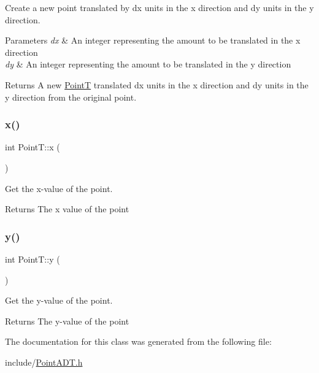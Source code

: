 Create a new point translated by dx units in the x direction and dy units in the y direction. 


\begin{DoxyParams}{Parameters}
{\em dx} & An integer representing the amount to be translated in the x direction \\
\hline
{\em dy} & An integer representing the amount to be translated in the y direction \\
\hline
\end{DoxyParams}
\begin{DoxyReturn}{Returns}
A new \mbox{\hyperlink{class_point_t}{PointT}} translated dx units in the x direction and dy units in the y direction from the original point. 
\end{DoxyReturn}
\mbox{\label{class_point_t_a6a0f58232f685470f82d3e87c084d690}} 
\subsubsection{\texorpdfstring{x()}{x()}}
{\footnotesize\ttfamily int Point\+T\+::x (\begin{DoxyParamCaption}{ }\end{DoxyParamCaption})}



Get the x-\/value of the point. 

\begin{DoxyReturn}{Returns}
The x value of the point 
\end{DoxyReturn}
\mbox{\label{class_point_t_ae79bfab48ddcec89cd27d22cc465e113}} 
\subsubsection{\texorpdfstring{y()}{y()}}
{\footnotesize\ttfamily int Point\+T\+::y (\begin{DoxyParamCaption}{ }\end{DoxyParamCaption})}



Get the y-\/value of the point. 

\begin{DoxyReturn}{Returns}
The y-\/value of the point 
\end{DoxyReturn}


The documentation for this class was generated from the following file\+:\begin{DoxyCompactItemize}
\item 
include/\mbox{\hyperlink{_point_a_d_t_8h}{Point\+A\+D\+T.\+h}}\end{DoxyCompactItemize}
